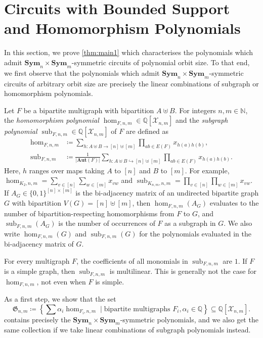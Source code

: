 \documentclass[10pt,a4paper]{article}
\theoremstyle{definition}
\theoremstyle{plain}
\theoremstyle{remark}
\DeclareMathOperator{\sub}{sub}
\newcommand{\Aut}{\mathbf{Aut}}
\newcommand{\Sym}{\mathbf{Sym}}
\begin{document}
	
	

	
	
	\section{Circuits with Bounded Support and Homomorphism Polynomials}
	\label{sec:circuitsAndHomPolynomials}
	In this section, we prove \cref{thm:main1} which characterises the polynomials which admit $\Sym_n \times \Sym_m$-symmetric circuits of polynomial orbit size.
	To that end, we first observe that  the polynomials which admit $\Sym_n \times \Sym_m$-symmetric circuits of arbitrary orbit size are precisely the linear combinations of subgraph or homomorphism polynomials.
	
	Let $F$ be a bipartite multigraph with bipartition $A \uplus B$.
	For integers $n,m \in \mathbb{N}$,
	the \emph{homomorphism polynomial $\hom_{F, n,m} \in \mathbb{Q}[\mathcal{X}_{n,m}]$} and the \emph{subgraph polynomial $\sub_{F, n,m} \in \mathbb{Q}[\mathcal{X}_{n,m}]$} of $F$ are defined as
	\begin{align*}
		\hom_{F, n, m} &\coloneqq \sum_{h \colon A \uplus B \to [n] \uplus [m]} \prod_{ab \in E(F)} x_{h(a)h(b)}, \\
		\sub_{F, n, m} &\coloneqq \frac{1}{|\Aut(F)|}\sum_{h \colon A \uplus B \hookrightarrow [n] \uplus [m]} \prod_{ab \in E(F)} x_{h(a)h(b)}.
	\end{align*}
	Here, $h$ ranges over maps taking $A$ to $[n]$ and $B$ to $[m]$.
	For example, $\hom_{K_2, n, m} = \sum_{v \in [n]} \sum_{w \in [m]} x_{vw}$ and $\sub_{K_{n,m}, n,m} = \prod_{v\in [n]} \prod_{w \in [m]} x_{vw}$. 
	If $A_G \in \{0,1\}^{[n] \times [m]}$ is the bi-adjacency matrix of an undirected bipartite graph $G$ with bipartition $V(G) = [n] \uplus [m]$, then $\hom_{F,n,m}(A_G)$ evaluates to the number of bipartition-respecting homomorphisms from $F$ to $G$, and $\sub_{F, n,m}(A_G)$ is the number of occurrences of $F$ as a subgraph in $G$. We also write $\hom_{F,n,m}(G)$ and $\sub_{F, n,m}(G)$ for the polynomials evaluated in the bi-adjacency matrix of $G$.
	
	For every multigraph $F$, the coefficients of all monomials in $\sub_{F,n,m}$ are $1$. If $F$ is a simple graph, then $\sub_{F,n,m}$ is multilinear. 
	This is generally not the case for $\hom_{F, n,m}$, not even when $F$ is simple.
	
	As a first step, we show that the set
	\[
		\mathfrak{G}_{n,m} \coloneqq \left\{\sum \alpha_i \hom_{F_i, n,m} \mid \text{bipartite multigraphs } F_i, \alpha_i \in \mathbb{Q} \right\} \subseteq \mathbb{Q}[\mathcal{X}_{n,m}].
	\]
	contains precisely the $\Sym_n \times \Sym_m$-symmetric
        polynomials, and we also get the same collection if we take linear
        combinations of subgraph polynomials instead.
	
\end{document}
